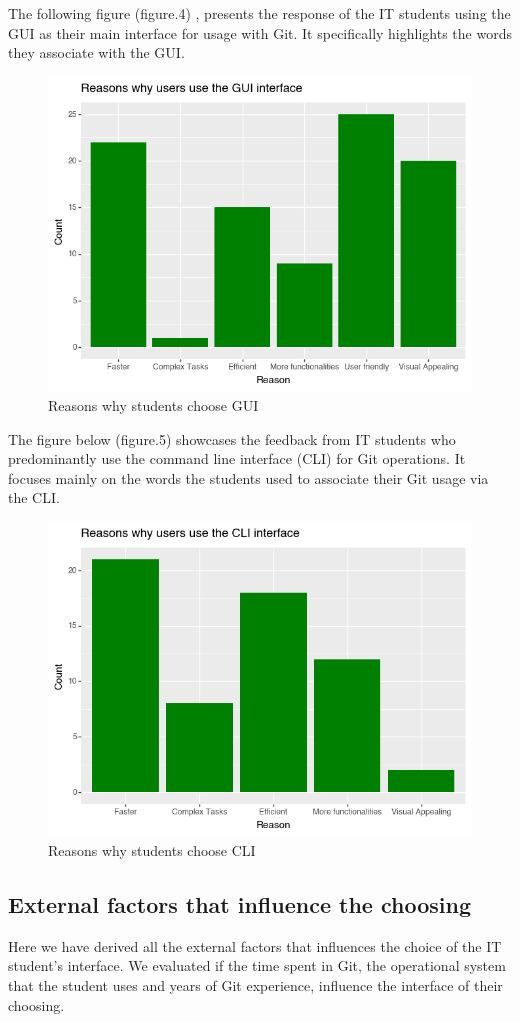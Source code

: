 \documentclass[]{report}
\begin{document}
	The following figure (figure.4) , presents the response of the IT students using the GUI as their main interface for usage with Git. It specifically highlights the words they associate with the GUI.
		\begin{figure}[H]
		\centering
		\includegraphics[width=0.75\linewidth]{ReasonsGUI}
		\caption{Reasons why students choose GUI}
		\label{fig: 4}
	\end{figure}
	
	The figure below (figure.5) showcases the feedback from IT students who predominantly use the command line interface (CLI) for Git operations. It focuses mainly on the words the students used to associate their Git usage via the CLI. 
	
	\begin{figure}[H]
		\centering
		\includegraphics[width=0.75\linewidth]{ReasonsCLI}
		\caption{Reasons why students choose CLI}
		\label{fig: 5}
	\end{figure}
	
	\subsection{External factors that influence the choosing }
	Here we have derived all the external factors that influences the choice of the IT student's interface.  We evaluated if the time spent in Git, the operational system that the student uses and years of Git experience, influence the interface of their choosing.\\
	
\end{document}

